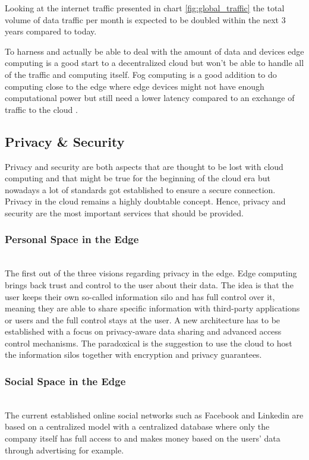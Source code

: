 Looking at the internet traffic presented in chart \ref{fig:global_traffic} the total volume of data traffic per month is expected to be doubled within the next 3 years compared to today.

To harness and actually be able to deal with the amount of data and devices edge computing is a good start to a decentralized cloud but won’t be able to handle all of the traffic and computing itself. Fog computing is a good addition to do computing close to the edge where edge devices might not have enough computational power but still need a lower latency compared to an exchange of traffic to the cloud .

\subsection{Privacy \& Security}
Privacy and security are both aspects that are thought to be lost with cloud computing and that might be true for the beginning of the cloud era but nowadays a lot of standards got established to ensure a secure connection. Privacy in the cloud remains a highly doubtable concept. Hence, privacy and security are the most important services that should be provided. 

\subsubsection{Personal Space in the Edge}\hspace*{\fill} \\
The first out of the three visions regarding privacy in the edge.
Edge computing brings back trust and control to the user about their data. The idea is that the user keeps their own so-called information silo and has full control over it, meaning they are able to share specific information with third-party applications or users and the full control stays at the user.
A new architecture has to be established with a focus on privacy-aware data sharing and advanced access control mechanisms. 
The paradoxical is the suggestion to use the cloud to host the information silos together with encryption and privacy guarantees.

\subsubsection{Social Space in the Edge}\hspace*{\fill} \\
The current established online social networks such as Facebook and Linkedin are based on a centralized model with a centralized database where only the company itself has full access to and makes money based on the users’ data through advertising for example.

